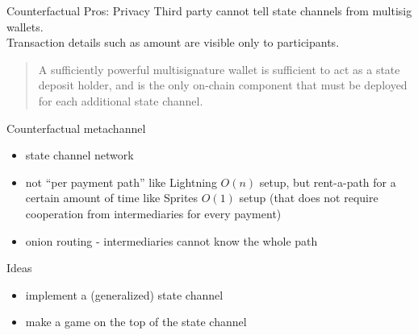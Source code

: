 \documentclass{beamer}
\begin{document}
\begin{frame}{Counterfactual Pros: Privacy}
Third party cannot tell state channels from multisig wallets.\\
Transaction details such as amount are visible only to participants.

\begin{quote}
A sufficiently powerful multisignature wallet is sufficient to act as a state deposit holder, and is the only on-chain component that must be deployed for each additional state channel.
\end{quote}
\end{frame}

\begin{frame}{Counterfactual metachannel}
\begin{itemize}
\item state channel network
\item not ``per payment path'' like Lightning $O(n)$ setup, but rent-a-path for a certain amount of time like Sprites $O(1)$ setup (that does not require cooperation from intermediaries for every payment)
\item onion routing - intermediaries cannot know the whole path
\end{itemize}
\end{frame}

\begin{frame}{Ideas}
\begin{itemize}
\item implement a (generalized) state channel
\item make a game on the top of the state channel
\end{itemize}
\end{frame}
\end{document}

